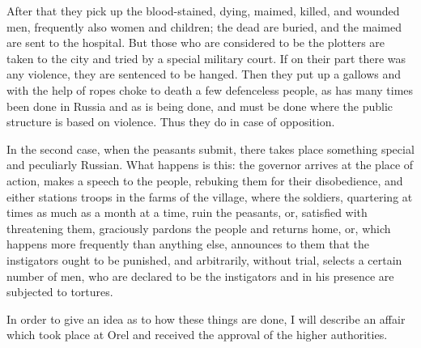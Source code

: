 \documentclass{book}
\begin{document}
After that they pick up the blood-stained, dying, maimed, killed, and wounded men, frequently also women and children; the dead are buried, and the maimed are sent to the hospital. But those who are considered to be the plotters are taken to the city and tried by a special military court. If on their part there was any violence, they are sentenced to be hanged. Then they put up a gallows and with the help of ropes choke to death a few defenceless people, as has many times been done in Russia and as is being done, and must be done where the public structure is based on violence. Thus they do in case of opposition.

In the second case, when the peasants submit, there takes place something special and peculiarly Russian. What happens is this: the governor arrives at the place of action, makes a speech to the people, rebuking them for their disobedience, and either stations troops in the farms of the village, where the soldiers, quartering at times as much as a month at a time, ruin the peasants, or, satisfied with threatening them, graciously pardons the people and returns home, or, which happens more frequently than anything else, announces to them that the instigators ought to be punished, and arbitrarily, without trial, selects a certain number of men, who are declared to be the instigators and in his presence are subjected to tortures.

In order to give an idea as to how these things are done, I will describe an affair which took place at Orel and received the approval of the higher authorities.
\end{document}
